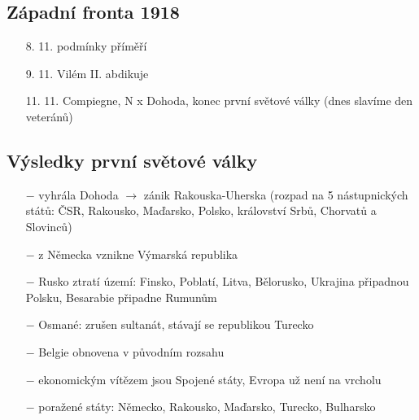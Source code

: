 \documentclass{article}
\begin{document}
\subsection*{Západní fronta 1918}
\begin{itemize}
    \vspace{-0.5em}
    \setlength\itemsep{0.15em}
    \item[8. 11.]  podmínky příměří
    \item[9. 11.]  Vilém II. abdikuje
    \item[11. 11.]  Compiegne, N x Dohoda, konec první světové války (dnes slavíme den veteránů)
\end{itemize}

\subsection*{Výsledky první světové války}
\begin{itemize}
    \vspace{-0.5em}
    \setlength\itemsep{0.15em}
    \item[$-$] vyhrála Dohoda $\rightarrow$ zánik Rakouska-Uherska (rozpad na 5 nástupnických států: ČSR, Rakousko, Maďarsko, Polsko, království Srbů, Chorvatů a Slovinců)
    \item[$-$] z Německa vznikne Výmarská republika
    \item[$-$] Rusko ztratí území: Finsko, Poblatí, Litva, Bělorusko, Ukrajina připadnou Polsku, Besarabie připadne Rumunům
    \item[$-$] Osmané: zrušen sultanát, stávají se republikou Turecko
    \item[$-$] Belgie obnovena v původním rozsahu
    \item[$-$] ekonomickým vítězem jsou Spojené státy, Evropa už není na vrcholu
    \item[$-$] poražené státy: Německo, Rakousko, Maďarsko, Turecko, Bulharsko
\end{itemize}
\end{document}
